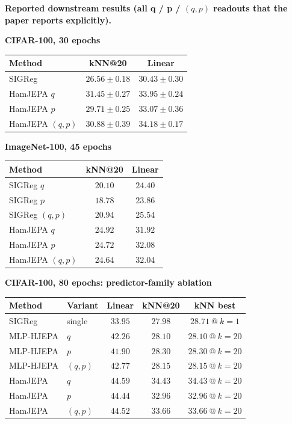 \documentclass[10pt]{article}
\begin{document}
\vspace{-1pt}
\begin{takebox}
\textbf{Reported downstream results (all q / p / \((q,p)\) readouts that the paper reports explicitly).}\vspace{3pt}

\begin{minipage}[t]{0.49\textwidth}
\centering\scriptsize
\textbf{CIFAR-100, 30 epochs}\par\vspace{2pt}
\begin{tabular}{@{}lcc@{}}
\toprule
Method & kNN@20 & Linear \\
\midrule
SIGReg & $26.56\pm0.18$ & $30.43\pm0.30$ \\
HamJEPA $q$ & $31.45\pm0.27$ & $33.95\pm0.24$ \\
HamJEPA $p$ & $29.71\pm0.25$ & $33.07\pm0.36$ \\
HamJEPA $(q,p)$ & $30.88\pm0.39$ & $34.18\pm0.17$ \\
\bottomrule
\end{tabular}
\end{minipage}\hfill
\begin{minipage}[t]{0.49\textwidth}
\centering\scriptsize
\textbf{ImageNet-100, 45 epochs}\par\vspace{2pt}
\begin{tabular}{@{}lcc@{}}
\toprule
Method & kNN@20 & Linear \\
\midrule
SIGReg $q$ & $20.10$ & $24.40$ \\
SIGReg $p$ & $18.78$ & $23.86$ \\
SIGReg $(q,p)$ & $20.94$ & $25.54$ \\
HamJEPA $q$ & $24.92$ & $31.92$ \\
HamJEPA $p$ & $24.72$ & $32.08$ \\
HamJEPA $(q,p)$ & $24.64$ & $32.04$ \\
\bottomrule
\end{tabular}
\end{minipage}

\vspace{5pt}
\centering\scriptsize
\textbf{CIFAR-100, 80 epochs: predictor-family ablation}\par\vspace{2pt}
\begin{tabular}{@{}llccc@{}}
\toprule
Method & Variant & Linear & kNN@20 & kNN best \\
\midrule
SIGReg & single & $33.95$ & $27.98$ & $28.71\ @\ k=1$ \\
MLP-HJEPA & $q$ & $42.26$ & $28.10$ & $28.10\ @\ k=20$ \\
MLP-HJEPA & $p$ & $41.90$ & $28.30$ & $28.30\ @\ k=20$ \\
MLP-HJEPA & $(q,p)$ & $42.77$ & $28.15$ & $28.15\ @\ k=20$ \\
HamJEPA & $q$ & $44.59$ & $34.43$ & $34.43\ @\ k=20$ \\
HamJEPA & $p$ & $44.44$ & $32.96$ & $32.96\ @\ k=20$ \\
HamJEPA & $(q,p)$ & $44.52$ & $33.66$ & $33.66\ @\ k=20$ \\
\bottomrule
\end{tabular}


\end{takebox}
\end{document}
